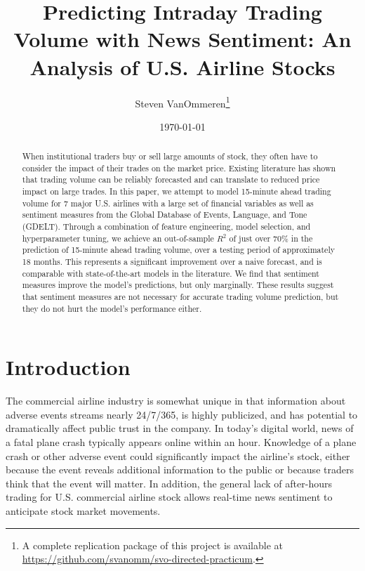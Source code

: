 \documentclass[12pt]{article}
\begin{document}
\title{Predicting Intraday Trading Volume with News Sentiment: An Analysis of U.S. Airline Stocks}
\author{Steven VanOmmeren\thanks{A complete replication package of this project is available at \url{https://github.com/svanomm/svo-directed-practicum}.}}
\date{\today}
\maketitle
\begin{abstract}
\noindent
    When institutional traders buy or sell large amounts of stock, they often have to consider the impact of their trades on the market price. Existing literature has shown that trading volume can be reliably forecasted and can translate to reduced price impact on large trades. In this paper, we attempt to model 15-minute ahead trading volume for 7 major U.S. airlines with a large set of financial variables as well as sentiment measures from the Global Database of Events, Language, and Tone (GDELT). Through a combination of feature engineering, model selection, and hyperparameter tuning, we achieve an out-of-sample $R^2$ of just over 70\% in the prediction of 15-minute ahead trading volume, over a testing period of approximately 18 months. This represents a significant improvement over a naive forecast, and is comparable with state-of-the-art models in the literature. We find that sentiment measures improve the model's predictions, but only marginally. These results suggest that sentiment measures are not necessary for accurate trading volume prediction, but they do not hurt the model's performance either. 
\end{abstract}
\doublespacing
\section{Introduction}
The commercial airline industry is somewhat unique in that information about adverse events streams nearly 24/7/365, is highly publicized, and has potential to dramatically affect public trust in the company. In today's digital world, news of a fatal plane crash typically appears online within an hour. Knowledge of a plane crash or other adverse event could significantly impact the airline's stock, either because the event reveals additional information to the public or because traders think that the event will matter. In addition, the general lack of after-hours trading for U.S. commercial airline stock allows real-time news sentiment to anticipate stock market movements.
    
\end{document}
